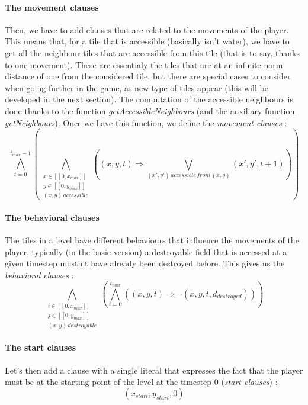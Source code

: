 \documentclass[a4paper, 12pt, titlepage]{article}
\begin{document}
\paragraph{The movement clauses}
Then, we have to add clauses that are related to the movements of the player.
This means that, for a tile that is accessible (basically isn't water), we have
to get all the neighbour tiles that are accessible from this tile (that is to
say, thanks to one movement). These are essentialy the tiles that are at an
infinite-norm distance of one from the considered tile, but there are special
cases to consider when going further in the game, as new type of tiles appear
(this will be developed in the next section). The computation of the accessible
neighbours is done thanks to the function {\em getAccessibleNeighbours} (and the
auxiliary function {\em getNeighbours}). Once we have this function, we define
the {\em movement clauses} :
\begin{equation}
\bigwedge \limits_{t=0}^{t_{max}-1}
       (\bigwedge \limits_{\substack{x \in [\![0, x_{max}]\!]\\
				     y \in [\![0, y_{max}]\!]\\
				     (x, y) \, accessible}}
	((x, y, t) \Rightarrow
	 \bigvee \limits_{(x', y') \, accessible \, from \, (x, y)}
	 (x', y', t+1)))
\end{equation}

\paragraph{The behavioral clauses}
The tiles in a level have different behaviours that influence the movements of
the player, typically (in the basic version) a destroyable field that is
accessed at a given timestep mustn't have already been destroyed before. This
gives us the {\em behavioral clauses} :
\begin{equation}
\bigwedge \limits_{\substack{i \in [\![0, x_{max}]\!]\\
			     j \in [\![0, y_{max}]\!]\\
			     (x, y) \, destroyable}}
(\bigwedge \limits_{t=0}^{t_{max}} ((x, y, t) \Rightarrow
				    \neg(x, y, t, d_{destroyed})))
\end{equation}

\paragraph{The start clauses}
Let's then add a clause with a single literal that expresses the fact that the
player must be at the starting point of the level at the timestep 0
({\em start clauses}) :
\begin{equation}
(x_{start}, y_{start}, 0)
\end{equation}
\end{document}
